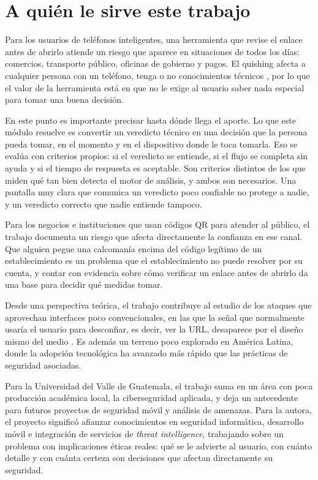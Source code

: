 \section{A quién le sirve este trabajo}

Para los usuarios de teléfonos inteligentes, una herramienta que revise el enlace antes de abrirlo atiende un riesgo que aparece en situaciones de todos los días: comercios, transporte público, oficinas de gobierno y pagos. El quishing afecta a cualquier persona con un teléfono, tenga o no conocimientos técnicos \cite{vidas2013qrishing}, por lo que el valor de la herramienta está en que no le exige al usuario saber nada especial para tomar una buena decisión.

En este punto es importante precisar hasta dónde llega el aporte. Lo que este módulo resuelve es convertir un veredicto técnico en una decisión que la persona pueda tomar, en el momento y en el dispositivo donde le toca tomarla. Eso se evalúa con criterios propios: si el veredicto se entiende, si el flujo se completa sin ayuda y si el tiempo de respuesta es aceptable. Son criterios distintos de los que miden qué tan bien detecta el motor de análisis, y ambos son necesarios. Una pantalla muy clara que comunica un veredicto poco confiable no protege a nadie, y un veredicto correcto que nadie entiende tampoco.

Para los negocios e instituciones que usan códigos QR para atender al público, el trabajo documenta un riesgo que afecta directamente la confianza en ese canal. Que alguien pegue una calcomanía encima del código legítimo de un establecimiento \cite{krombholz2014qr} es un problema que el establecimiento no puede resolver por su cuenta, y contar con evidencia sobre cómo verificar un enlace antes de abrirlo da una base para decidir qué medidas tomar.

Desde una perspectiva teórica, el trabajo contribuye al estudio de los ataques que aprovechan interfaces poco convencionales, en las que la señal que normalmente usaría el usuario para desconfiar, es decir, ver la URL, desaparece por el diseño mismo del medio \cite{vidas2013qrishing,krombholz2014qr}. Es además un terreno poco explorado en América Latina, donde la adopción tecnológica ha avanzado más rápido que las prácticas de seguridad asociadas.

Para la Universidad del Valle de Guatemala, el trabajo suma en un área con poca producción académica local, la ciberseguridad aplicada, y deja un antecedente para futuros proyectos de seguridad móvil y análisis de amenazas. Para la autora, el proyecto significó afianzar conocimientos en seguridad informática, desarrollo móvil e integración de servicios de \emph{threat intelligence}, trabajando sobre un problema con implicaciones éticas reales: qué se le advierte al usuario, con cuánto detalle y con cuánta certeza son decisiones que afectan directamente su seguridad.

